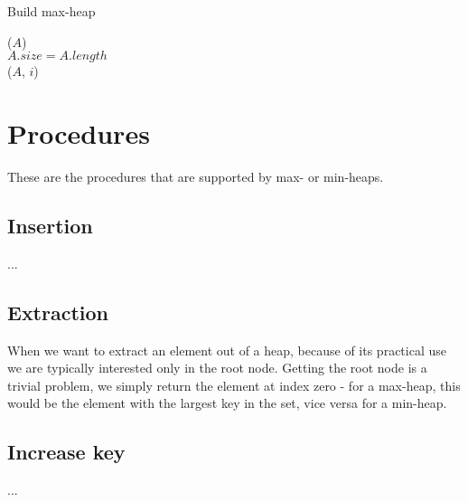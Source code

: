 
\begin{algorithm}[H]
	\caption{Build max-heap}
	\label{alg:build-max-heap}
	
	
	
	
	
	\BlankLine
	\BuildMaxHeap($A$) \\
	\Begin
	{
		$A.size = A.length$ \\
		{
			\MaxHeapify($A$, $i$)
		}
	}
\end{algorithm}

\section{Procedures}
These are the procedures that are supported by max- or min-heaps.

\subsection{Insertion}
...


\subsection{Extraction}
When we want to extract an element out of a heap, because of its practical use
we are typically interested only in the root node. Getting the root node is a
trivial problem, we simply return the element at index zero - for a max-heap,
this would be the element with the largest key in the set, vice versa for a
min-heap.


\subsection{Increase key}
...



